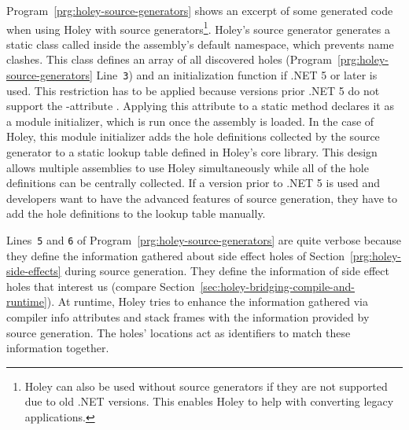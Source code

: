 Program~\ref{prg:holey-source-generators} shows an excerpt of some generated code when using Holey with source generators\footnote{Holey can also be used without source generators if they are not supported due to old .NET versions. This enables Holey to help with converting legacy applications.}.
Holey's source generator generates a static class called \texttt{} inside the assembly's default namespace, which prevents name clashes.
This class defines an array of all discovered holes (Program~\ref{prg:holey-source-generators} Line~\verb|3|) and an initialization function if .NET 5 or later is used.
This restriction has to be applied because versions prior .NET 5 do not support the \texttt{\seqsplit{[ModuleInitializer]}}-attribute \cite{microsoft_module_2023}.
Applying this attribute to a static method declares it as a module initializer, which is run once the assembly is loaded.
In the case of Holey, this module initializer adds the hole definitions collected by the source generator to a static lookup table defined in Holey's core library.
This design allows multiple assemblies to use Holey simultaneously while all of the hole definitions can be centrally collected.
If a version prior to .NET 5 is used and developers want to have the advanced features of source generation, they have to add the hole definitions to the lookup table manually.

Lines~\verb|5| and \verb|6| of Program~\ref{prg:holey-source-generators} are quite verbose because they define the information gathered about side effect holes of Section~\ref{prg:holey-side-effects} during source generation.
They define the information of side effect holes that interest us (compare Section~\ref{sec:holey-bridging-compile-and-runtime}).
At runtime, Holey tries to enhance the information gathered via compiler info attributes and stack frames with the information provided by source generation.
The holes' locations act as identifiers to match these information together.

